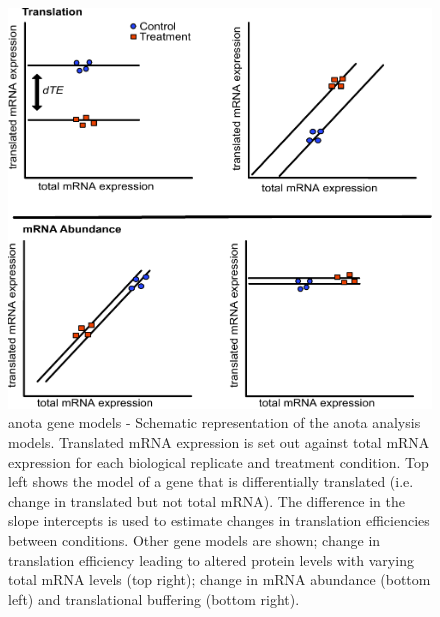 \documentclass[
  12pt,
  openany]{book}
\begin{document}
\begin{figure}
  \includegraphics{./figures/geneModes_anota_Larsson.pdf}
  \caption{anota gene models - Schematic representation of the anota analysis models. Translated mRNA expression is set out against total mRNA expression for each biological replicate and treatment condition. Top left shows the model of a gene that is differentially translated (i.e. change in translated but not total mRNA). The difference in the slope intercepts is used to estimate changes in translation efficiencies between conditions. Other gene models are shown; change in translation efficiency leading to altered protein levels with varying total mRNA levels (top right); change in mRNA abundance (bottom left) and translational buffering (bottom right).
  \label{fig:anota}}
\end{figure}
\end{document}
